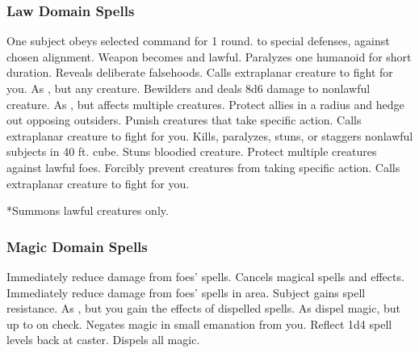 \subsubsection{Law Domain Spells}

\begin{spelllist}
   One subject obeys selected command for 1 round.
    to special defenses,  against chosen alignment.
   Weapon becomes  and lawful.
   Paralyzes one humanoid for short duration.
   Reveals deliberate falsehoods.
   Calls extraplanar creature to fight for you.
   As , but any creature.
   Bewilders and deals 8d6 damage to nonlawful creature.
   As , but affects multiple creatures.
   Protect allies in a \areamed radius and hedge out opposing outsiders.
   Punish creatures that take specific action.
   Calls extraplanar creature to fight for you.
   Kills, paralyzes, stuns, or staggers nonlawful subjects in 40 ft. cube.
  \spellhead[7]{}
   Stuns bloodied creature.
  \F Protect multiple creatures against lawful foes.
   Forcibly prevent creatures from taking specific action.
   Calls extraplanar creature to fight for you.
\end{spelllist}
*Summons lawful creatures only.

\subsubsection{Magic Domain Spells}

\begin{spelllist}
   Immediately reduce damage from foes' spells.
  \spellhead[1]{}
  \spellhead[2]{}
  \spellhead[2]{}
   Cancels magical spells and effects.
   Immediately reduce damage from foes' spells in area.
  \spellhead[4]{}
   Subject gains spell resistance.
  \spellhead[5]{}
   As , but you gain the effects of dispelled spells.
  \spellhead[6]{}
   As dispel magic, but up to  on check.
   Negates magic in small emanation from you.
   Reflect 1d4 spell levels back at caster.
  \spellhead[8]{}
  \spellhead[8]{}
   Dispels all magic.
  \spellhead[9]{}
\end{spelllist}

